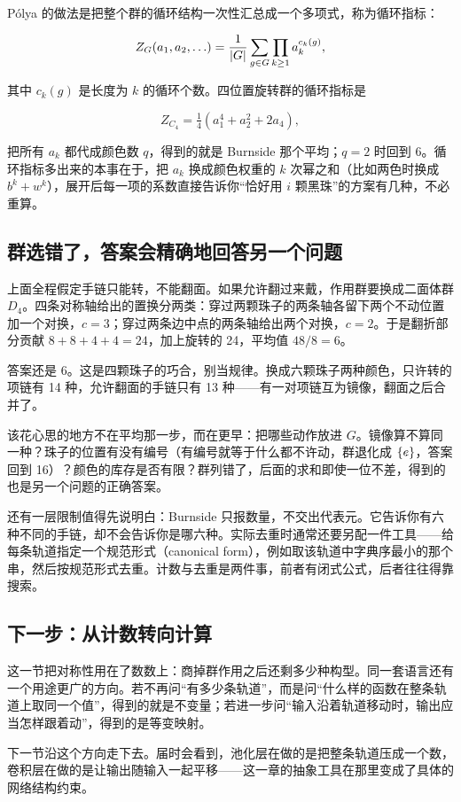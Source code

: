 Pólya 的做法是把整个群的循环结构一次性汇总成一个多项式，称为循环指标：

\[
Z_G(a_1,a_2,\ldots)=\frac1{\left|G\right|}\sum_{g\in G}\prod_{k\ge1}a_k^{c_k(g)},
\]

其中 \(c_k(g)\) 是长度为 \(k\) 的循环个数。四位置旋转群的循环指标是

\[
Z_{C_4}=\tfrac14\left(a_1^4+a_2^2+2a_4\right),
\]

把所有 \(a_k\) 都代成颜色数 \(q\)，得到的就是 Burnside 那个平均；\(q=2\) 时回到 6。循环指标多出来的本事在于，把 \(a_k\) 换成颜色权重的 \(k\) 次幂之和（比如两色时换成 \(b^k+w^k\)），展开后每一项的系数直接告诉你``恰好用 \(i\) 颗黑珠''的方案有几种，不必重算。

\subsection{群选错了，答案会精确地回答另一个问题}

上面全程假定手链只能转，不能翻面。如果允许翻过来戴，作用群要换成二面体群 \(D_4\)。四条对称轴给出的置换分两类：穿过两颗珠子的两条轴各留下两个不动位置加一个对换，\(c=3\)；穿过两条边中点的两条轴给出两个对换，\(c=2\)。于是翻折部分贡献 \(8+8+4+4=24\)，加上旋转的 24，平均值 \(48/8=6\)。

答案还是 6。这是四颗珠子的巧合，别当规律。换成六颗珠子两种颜色，只许转的项链有 14 种，允许翻面的手链只有 13 种——有一对项链互为镜像，翻面之后合并了。

该花心思的地方不在平均那一步，而在更早：把哪些动作放进 \(G\)。镜像算不算同一种？珠子的位置有没有编号（有编号就等于什么都不许动，群退化成 \(\left\{e\right\}\)，答案回到 16）？颜色的库存是否有限？群列错了，后面的求和即使一位不差，得到的也是另一个问题的正确答案。

还有一层限制值得先说明白：Burnside 只报数量，不交出代表元。它告诉你有六种不同的手链，却不会告诉你是哪六种。实际去重时通常还要另配一件工具——给每条轨道指定一个规范形式（canonical form），例如取该轨道中字典序最小的那个串，然后按规范形式去重。计数与去重是两件事，前者有闭式公式，后者往往得靠搜索。

\subsection{下一步：从计数转向计算}

这一节把对称性用在了数数上：商掉群作用之后还剩多少种构型。同一套语言还有一个用途更广的方向。若不再问``有多少条轨道''，而是问``什么样的函数在整条轨道上取同一个值''，得到的就是不变量；若进一步问``输入沿着轨道移动时，输出应当怎样跟着动''，得到的是等变映射。

下一节沿这个方向走下去。届时会看到，池化层在做的是把整条轨道压成一个数，卷积层在做的是让输出随输入一起平移——这一章的抽象工具在那里变成了具体的网络结构约束。
